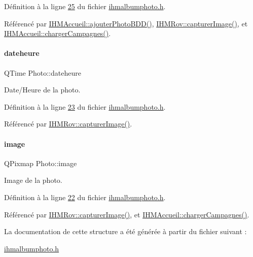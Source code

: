 Définition à la ligne \hyperlink{ihmalbumphoto_8h_source_l00025}{25} du fichier \hyperlink{ihmalbumphoto_8h_source}{ihmalbumphoto.\+h}.



Référencé par \hyperlink{ihmaccueil_8cpp_source_l00313}{I\+H\+M\+Accueil\+::ajouter\+Photo\+B\+D\+D()}, \hyperlink{ihmrov_8cpp_source_l00179}{I\+H\+M\+Rov\+::capturer\+Image()}, et \hyperlink{ihmaccueil_8cpp_source_l00130}{I\+H\+M\+Accueil\+::charger\+Campagnes()}.

\mbox{\label{struct_photo_a0ac4d5bba2d119ca73ba949d18a557bd}} 
\paragraph{\texorpdfstring{dateheure}{dateheure}}
{\footnotesize\ttfamily Q\+Time Photo\+::dateheure}



Date/\+Heure de la photo. 



Définition à la ligne \hyperlink{ihmalbumphoto_8h_source_l00023}{23} du fichier \hyperlink{ihmalbumphoto_8h_source}{ihmalbumphoto.\+h}.



Référencé par \hyperlink{ihmrov_8cpp_source_l00179}{I\+H\+M\+Rov\+::capturer\+Image()}.

\mbox{\label{struct_photo_aa6ecfed8082bea5af2905208308a6adb}} 
\paragraph{\texorpdfstring{image}{image}}
{\footnotesize\ttfamily Q\+Pixmap Photo\+::image}



Image de la photo. 



Définition à la ligne \hyperlink{ihmalbumphoto_8h_source_l00022}{22} du fichier \hyperlink{ihmalbumphoto_8h_source}{ihmalbumphoto.\+h}.



Référencé par \hyperlink{ihmrov_8cpp_source_l00179}{I\+H\+M\+Rov\+::capturer\+Image()}, et \hyperlink{ihmaccueil_8cpp_source_l00130}{I\+H\+M\+Accueil\+::charger\+Campagnes()}.



La documentation de cette structure a été générée à partir du fichier suivant \+:\begin{DoxyCompactItemize}
\item 
\hyperlink{ihmalbumphoto_8h}{ihmalbumphoto.\+h}\end{DoxyCompactItemize}
